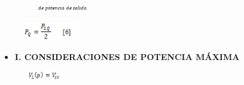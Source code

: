 \documentclass[12pt]{article}
\begin{document}

\begin{figure}[H]
	\begin{Center}
		\includegraphics[width=1.32in,height=0.12in]{./media/image26.gif}
	\end{Center}
\end{figure}



\par




\begin{figure}[H]
	\begin{Center}
		\includegraphics[width=0.94in,height=0.3in]{./media/image27.gif}
	\end{Center}
\end{figure}



\par

\begin{itemize}
	\item \textbf{I. CONSIDERACIONES DE POTENCIA MÁXIMA}
\end{itemize}\par




\begin{figure}[H]
	\begin{Center}
		\includegraphics[width=0.67in,height=0.15in]{./media/image28.gif}
	\end{Center}
\end{figure}


\end{document}
